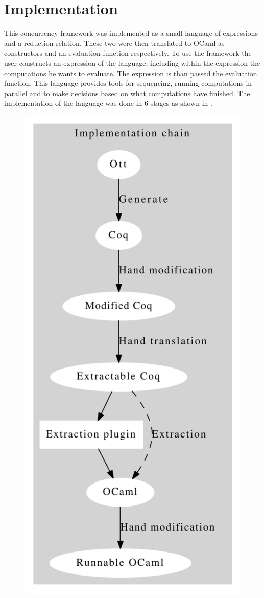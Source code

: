\documentclass[12pt,twoside,notitlepage]{report}
\begin{document}
\chapter{Implementation}
This concurrency framework was implemented as a small language of expressions and a reduction relation. These two were then translated to OCaml as constructors and an evaluation function respectively. To use the framework the user constructs an expression of the language, including within the expression the computations he wants to evaluate. The expression is than passed the evaluation function.  This language provides tools for sequencing, running computations in parallel and to make decisions based on what computations have finished. The implementation of the language was done in 6 stages as shown in . 
\begin{figure}[h]
\begin{center}
\includegraphics[scale=0.5]{implOut}

\end{center}
\end{figure}
\end{document}
